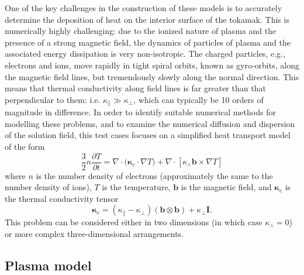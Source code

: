 \documentclass{article}
\begin{document}
One of the key challenges in the construction of these models is to accurately
determine the deposition of heat on the interior surface of the tokamak. This is
numerically highly challenging: due to the ionized nature of plasma and the
presence of a strong magnetic field, the dynamics of particles of plasma and the
associated energy dissipation is very non-isotropic. The charged particles,
e.g., electrons and ions, move rapidly in tight spiral orbits, known as
gyro-orbits, along the magnetic field lines, but tremendously slowly along the
normal direction. This means that thermal conductivity along field lines is far
greater than that perpendicular to them: i.e.
$\kappa_{\parallel} \gg \kappa_{\perp}$, which can typically be 10 orders of
magnitude in difference. In order to identify suitable numerical methods for
modelling these problems, and to examine the numerical diffusion and dispersion
of the solution field, this test cases focuses on a simplified heat transport
model of the form
%
\[
  \frac{3}{2} n \frac{\partial T}{\partial t} = \nabla \cdot \big(\bm{\kappa}_c
  \cdot \nabla T \big) + \nabla \cdot [\kappa_{\wedge}\bm{b}\times\nabla T]
\]
%
where $n$ is the number density of electrons (approximately the same to the
number density of ions), $T$ is the temperature, $\bm{b}$ is the magnetic field,
and $\bm{\kappa}_c$ is the thermal conductivity tensor
\[
  \bm{\kappa}_c = (\kappa_{\parallel}-\kappa_{\perp}) (\bm{b}\otimes \bm{b}) +
  \kappa_{\perp}\bm{I}.
\]
This problem can be considered either in two dimensions (in which case
$\kappa_\wedge = 0$) or more complex three-dimensional arrangements.

\subsection{Plasma model}
\end{document}
